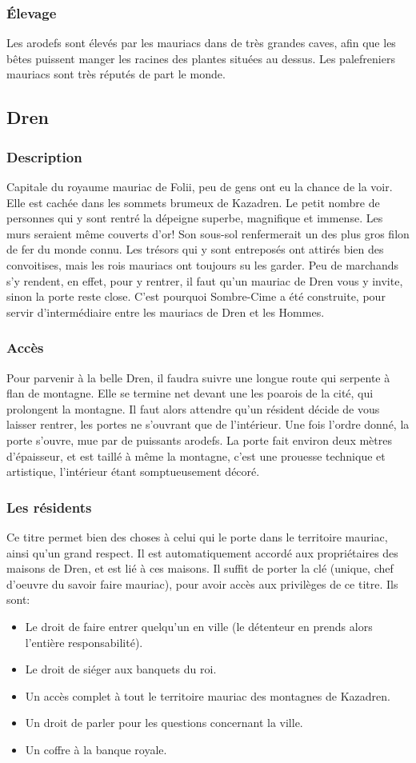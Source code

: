 \subsubsection{Élevage}
Les arodefs sont élevés par les mauriacs dans de très grandes caves, afin que les bêtes puissent manger les racines des plantes situées au dessus. Les palefreniers mauriacs sont très réputés de part le monde. 
\subsection{Dren}
\subsubsection{Description}
\hypertarget{dren}{}Capitale du royaume mauriac de Folii, peu de gens ont eu la chance de la voir.
Elle est cachée dans les sommets brumeux de Kazadren.
Le petit nombre de personnes qui y sont rentré la dépeigne superbe, magnifique et immense.
Les murs seraient même couverts d'or! 
Son sous-sol renfermerait un des plus gros filon de fer du monde connu.
Les trésors qui y sont entreposés ont attirés bien des convoitises, mais les rois mauriacs ont toujours su les garder.
Peu de marchands s'y rendent, en effet, pour y rentrer, il faut qu'un mauriac de Dren vous y invite, sinon la porte reste close.
C'est pourquoi Sombre-Cime a été construite, pour servir d'intermédiaire entre les mauriacs de Dren et les Hommes.
\subsubsection{Accès}
Pour parvenir à la belle Dren, il faudra suivre une longue route qui serpente à flan de montagne. Elle se termine net devant une les poarois de la cité, qui prolongent la montagne. Il faut alors attendre qu'un résident décide de vous laisser rentrer, les portes ne s'ouvrant que de l’intérieur. Une fois l'ordre donné, la porte s'ouvre, mue par de puissants arodefs. La porte fait environ deux mètres d'épaisseur, et est taillé à même la montagne, c'est une prouesse technique et artistique, l'intérieur étant somptueusement décoré.
\subsubsection{Les résidents}
Ce titre permet bien des choses à celui qui le porte dans le territoire mauriac, ainsi qu'un grand respect. Il est automatiquement accordé aux propriétaires des maisons de Dren, et est lié à ces maisons. Il suffit de porter la clé (unique, chef d'oeuvre du savoir faire mauriac), pour avoir accès aux privilèges de ce titre. Ils sont:
\begin{itemize}
\item Le droit de faire entrer quelqu'un en ville (le détenteur en prends alors l'entière responsabilité).
\item Le droit de siéger aux banquets du roi.
\item Un accès complet à tout le territoire mauriac des montagnes de Kazadren.
\item Un droit de parler pour les questions concernant la ville.
\item Un coffre à la banque royale.
\end{itemize}
